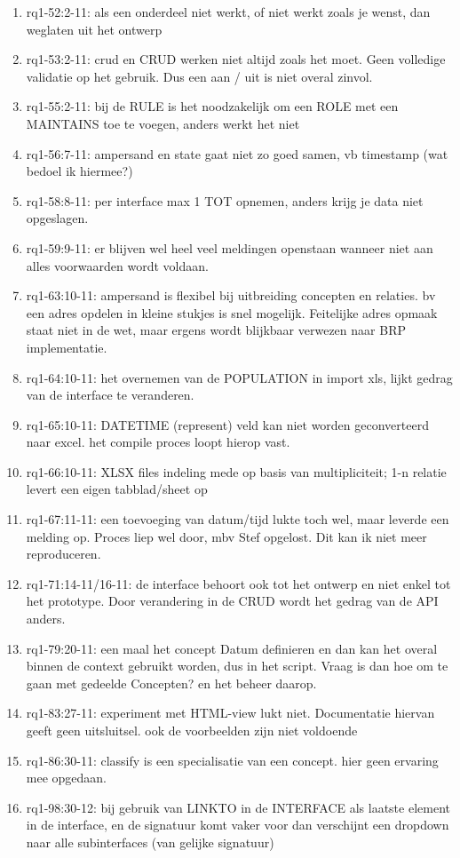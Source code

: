 \begin{enumerate}
    \item rq1-52:2-11: als een onderdeel niet werkt, of niet werkt zoals je wenst, dan weglaten uit het ontwerp
    \item rq1-53:2-11: crud en CRUD werken niet altijd zoals het moet. Geen volledige validatie op het gebruik. Dus een aan / uit is niet overal zinvol. 
    \item rq1-55:2-11: bij de RULE  is het noodzakelijk om een ROLE met een MAINTAINS toe te voegen, anders werkt het niet
    \item rq1-56:7-11: ampersand en state gaat niet zo goed samen, vb timestamp (wat bedoel ik hiermee?)
    \item rq1-58:8-11: per interface max 1 TOT opnemen, anders krijg je data niet opgeslagen.
    \item rq1-59:9-11: er blijven wel heel veel meldingen openstaan wanneer niet aan alles voorwaarden wordt voldaan.
    \item rq1-63:10-11: ampersand is flexibel bij uitbreiding concepten en relaties. bv een adres opdelen in kleine stukjes is snel mogelijk. Feitelijke adres opmaak staat niet in de wet, maar ergens wordt blijkbaar verwezen naar BRP implementatie.
    \item rq1-64:10-11: het overnemen van de POPULATION in import xls, lijkt gedrag van de interface te veranderen. 
    \item rq1-65:10-11: DATETIME (represent) veld kan niet worden geconverteerd naar excel. het compile proces loopt hierop vast.
    \item rq1-66:10-11: XLSX files indeling mede op basis van multipliciteit; 1-n relatie levert een eigen tabblad/sheet op 
    \item rq1-67:11-11: een toevoeging van datum/tijd lukte toch wel, maar leverde  een melding op. Proces liep wel door, mbv Stef opgelost. Dit kan ik niet meer reproduceren.
    \item rq1-71:14-11/16-11: de interface behoort ook tot het ontwerp en niet enkel tot het prototype. Door verandering in de CRUD wordt het gedrag van de API anders.
    \item rq1-79:20-11: een maal het concept Datum definieren en dan kan het overal binnen de context gebruikt worden, dus in het script.
    Vraag is dan hoe om te gaan met gedeelde Concepten? en het beheer daarop.
    \item rq1-83:27-11: experiment met HTML-view lukt niet. 
    Documentatie hiervan geeft geen uitsluitsel. 
    ook de voorbeelden zijn niet voldoende 
    \item rq1-86:30-11: classify is een specialisatie van een concept. hier geen ervaring mee opgedaan.
    \item rq1-98:30-12: bij gebruik van LINKTO in de INTERFACE als laatste element in de interface, en de signatuur komt vaker voor dan verschijnt een dropdown naar alle subinterfaces (van gelijke signatuur)
\end{enumerate}

